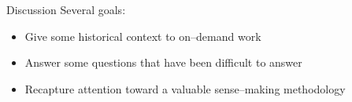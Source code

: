 \documentclass[presentation]{subfiles}
\begin{document}


\begin{frame}{Discussion}
Several goals:
\begin{itemize}
  \item Give some historical context to \alert{on--demand work}
  \item Answer some questions that have been difficult to answer
  \item Recapture attention toward a valuable sense--making methodology
\end{itemize}
\end{frame}


\end{document}
